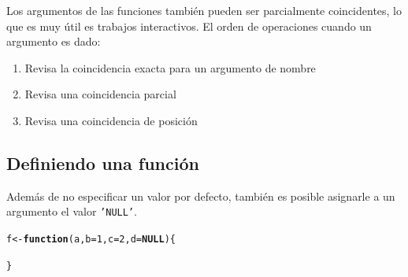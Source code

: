 \documentclass{article}\usepackage[]{graphicx}\usepackage[]{color}
\makeatletter
\newcommand{\hlnum}[1]{\textcolor[rgb]{0.686,0.059,0.569}{#1}}%
\newcommand{\hlstd}[1]{\textcolor[rgb]{0.345,0.345,0.345}{#1}}%
\newcommand{\hlkwa}[1]{\textcolor[rgb]{0.161,0.373,0.58}{\textbf{#1}}}%
\newcommand{\hlkwb}[1]{\textcolor[rgb]{0.69,0.353,0.396}{#1}}%
\newcommand{\hlkwc}[1]{\textcolor[rgb]{0.333,0.667,0.333}{#1}}%
\newenvironment{kframe}{%
 \def\at@end@of@kframe{}%
 \ifinner\ifhmode%
  \def\at@end@of@kframe{\end{minipage}}%
  \begin{minipage}{\columnwidth}%
 \fi\fi%
 \def\FrameCommand##1{\hskip\@totalleftmargin \hskip-\fboxsep
 \colorbox{shadecolor}{##1}\hskip-\fboxsep
     \hskip-\linewidth \hskip-\@totalleftmargin \hskip\columnwidth}%
 \MakeFramed {\advance\hsize-\width
   \@totalleftmargin\z@ \linewidth\hsize
   \@setminipage}}%
 {\par\unskip\endMakeFramed%
 \at@end@of@kframe}
\newenvironment{knitrout}{}{} %
\makeatother
\begin{document}
Los argumentos de las funciones también pueden ser parcialmente coincidentes, lo que es muy útil es trabajos interactivos. El orden de operaciones cuando un argumento es dado:
    \begin{enumerate}
      \item Revisa la coincidencia exacta para un argumento de nombre
      \item Revisa una coincidencia parcial
      \item Revisa una coincidencia de posición
    \end{enumerate}

  \subsection{Definiendo una función}
  Además de no especificar un valor por defecto, también es posible asignarle a un argumento el valor \texttt{'NULL'}. 
\begin{knitrout}
\color{fgcolor}\begin{kframe}
\begin{alltt}
  \hlstd{f} \hlkwb{<-} \hlkwa{function}\hlstd{(}\hlkwc{a}\hlstd{,} \hlkwc{b} \hlstd{=} \hlnum{1}\hlstd{,} \hlkwc{c} \hlstd{=} \hlnum{2}\hlstd{,} \hlkwc{d} \hlstd{=} \hlkwa{NULL}\hlstd{)\{}

  \hlstd{\}}
\end{alltt}
\end{kframe}
\end{knitrout}
  
\end{document}
